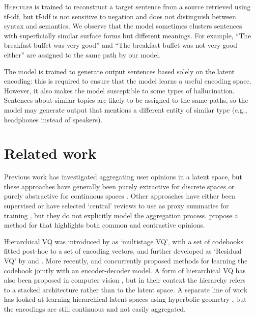 \documentclass[11pt]{article}
\begin{document}
\textsc{Hercules} is trained to reconstruct a target sentence from a source retrieved using tf-idf, but tf-idf is not sensitive to negation and does not distinguish between syntax and semantics. We observe that the model sometimes clusters sentences with superficially similar surface forms but different meanings. For example, ``The breakfast buffet was very good'' and ``The breakfast buffet was not very good either'' are assigned to the same path by our model.

The model is trained to generate output sentences based solely on the latent encoding: this is required to ensure that the model learns a useful encoding space. However, it also makes the model susceptible to some types of hallucination. Sentences about similar topics are likely to be assigned to the same paths, so the model may generate output that mentions a different entity of similar type (e.g., headphones instead of speakers).







\section{Related work}

Previous work has investigated aggregating user opinions in a latent space, but these approaches have generally been purely extractive for discrete spaces \cite{angelidis-etal-2021-extractive,basu-roy-chowdhury-etal-2022-unsupervised} or purely abstractive for continuous spaces \cite{iso-etal-2021-convex-aggregation}. Other approaches have either been supervised \cite{brazinskas-etal-2021-learning} or have selected `central' reviews to use as proxy summaries for training \cite{amplayo-etal-2021-aspect,amplayo2021unsupervised}, but they do not explicitly model the aggregation process. \citet{iso-etal-2022-comparative} propose a method for that highlights both common and contrastive opinions.


Hierarchical VQ was introduced by \citet{1171604} as `multistage VQ', with a set of codebooks fitted post-hoc to a set of encoding vectors, and further developed as `Residual VQ' by \citet{rvq} and \citet{10.1007/978-3-031-05933-9_17}. More recently, \citet{10.1109/TASLP.2021.3129994} and \citet{hosking-etal-2022-hierarchical} concurrently proposed methods for learning the codebook jointly with an encoder-decoder model. A form of hierarchical VQ 
has also been proposed in computer vision \cite{vqvae2}, but in their context the hierarchy refers to a stacked architecture rather than to the latent space. A separate line of work has looked at learning hierarchical latent spaces using hyperbolic geometry \cite{mathieu2019poincare,suris2021hyperfuture}, but the encodings are still continuous and not easily aggregated. 
\end{document}
